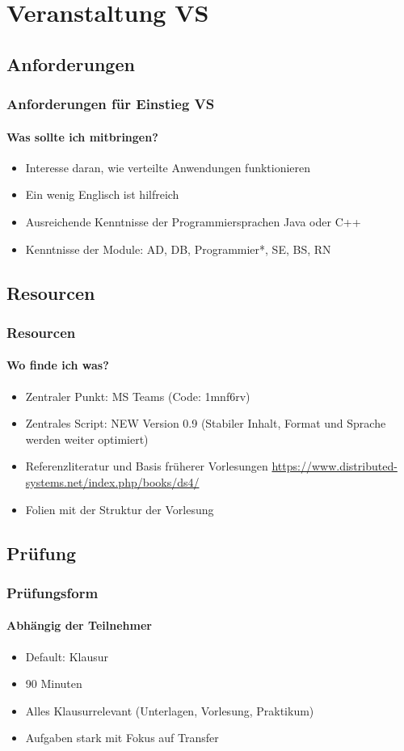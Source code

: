 \section{Veranstaltung VS}
\subsection{Anforderungen}
\begin{frame}
  \frametitle{Anforderungen für Einstieg VS}
  \framesubtitle{Was sollte ich mitbringen? }
  \begin{itemize}
    \item Interesse daran, wie verteilte Anwendungen funktionieren
    \item Ein wenig Englisch ist hilfreich
    \item Ausreichende Kenntnisse der Programmiersprachen Java oder C++
    \item Kenntnisse der Module: AD, DB, Programmier*, SE, BS, RN 
  \end{itemize}
\end{frame}
\subsection{Resourcen}
\begin{frame}
  \frametitle{Resourcen}
  \framesubtitle{Wo finde ich was?}
  \begin{itemize}
    \item Zentraler Punkt: MS Teams (Code: 1mnf6rv)
    \item Zentrales Script: NEW Version 0.9 (Stabiler Inhalt, Format und Sprache werden weiter optimiert)
    \item Referenzliteratur und Basis früherer Vorlesungen \url{https://www.distributed-systems.net/index.php/books/ds4/}
    \item Folien mit der Struktur der Vorlesung 
  \end{itemize}
\end{frame}

\subsection{Prüfung}
\begin{frame}
  \frametitle{Prüfungsform}
  \framesubtitle{Abhängig der Teilnehmer}
  \begin{itemize}
    \item Default: Klausur
    \item 90 Minuten 
    \item Alles Klausurrelevant (Unterlagen, Vorlesung, Praktikum)
    \item Aufgaben stark mit Fokus auf Transfer
  \end{itemize}
\end{frame}

